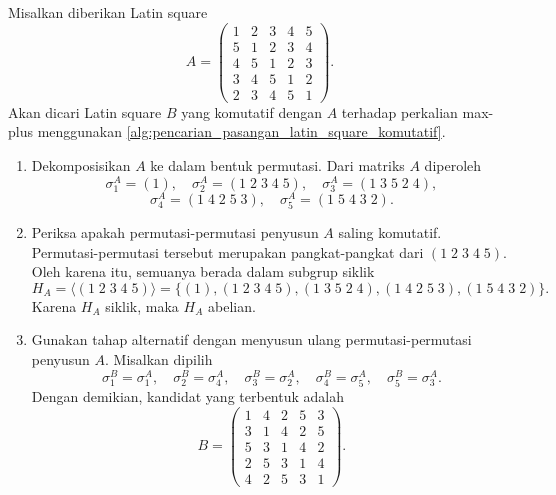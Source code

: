 \begin{contoh}\label{contoh:penerapan_algoritma_ordo_5_alternatif}
  Misalkan diberikan Latin square
  \[
    A=
    \begin{pmatrix}
      1 & 2 & 3 & 4 & 5 \\
      5 & 1 & 2 & 3 & 4 \\
      4 & 5 & 1 & 2 & 3 \\
      3 & 4 & 5 & 1 & 2 \\
      2 & 3 & 4 & 5 & 1
    \end{pmatrix}.
  \]
  Akan dicari Latin square $B$ yang komutatif dengan $A$ terhadap perkalian
  max-plus menggunakan \autoref{alg:pencarian_pasangan_latin_square_komutatif}.

  \begin{enumerate}
    \item Dekomposisikan $A$ ke dalam bentuk permutasi. Dari matriks $A$
          diperoleh
          \[
            \sigma_1^A=(1),\quad
            \sigma_2^A=(1\;2\;3\;4\;5),\quad
            \sigma_3^A=(1\;3\;5\;2\;4),
          \]
          \[
            \sigma_4^A=(1\;4\;2\;5\;3),\quad
            \sigma_5^A=(1\;5\;4\;3\;2).
          \]

    \item Periksa apakah permutasi-permutasi penyusun $A$ saling komutatif.
          Permutasi-permutasi tersebut merupakan pangkat-pangkat dari
          $(1\;2\;3\;4\;5)$. Oleh karena itu, semuanya berada dalam subgrup
          siklik
          \[
            H_A=
            \langle (1\;2\;3\;4\;5)\rangle
            =
            \{
            (1),
            (1\;2\;3\;4\;5),
            (1\;3\;5\;2\;4),
            (1\;4\;2\;5\;3),
            (1\;5\;4\;3\;2)
            \}.
          \]
          Karena $H_A$ siklik, maka $H_A$ abelian.

    \item Gunakan tahap alternatif dengan menyusun ulang permutasi-permutasi
          penyusun $A$. Misalkan dipilih
          \[
            \sigma_1^B=\sigma_1^A,\quad
            \sigma_2^B=\sigma_4^A,\quad
            \sigma_3^B=\sigma_2^A,\quad
            \sigma_4^B=\sigma_5^A,\quad
            \sigma_5^B=\sigma_3^A.
          \]
          Dengan demikian, kandidat yang terbentuk adalah
          \[
            B=
            \begin{pmatrix}
              1 & 4 & 2 & 5 & 3 \\
              3 & 1 & 4 & 2 & 5 \\
              5 & 3 & 1 & 4 & 2 \\
              2 & 5 & 3 & 1 & 4 \\
              4 & 2 & 5 & 3 & 1
            \end{pmatrix}.
          \]


\end{enumerate}
\end{contoh}
